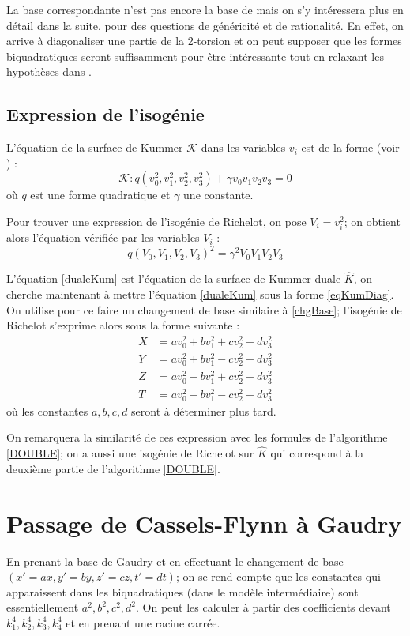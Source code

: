 \documentclass[a4paper]{article}
\theoremstyle{definition}
\theoremstyle{remark}
\numberwithin{equation}{section}
\begin{document}
La base correspondante n'est pas encore la base de \citet{gaudry} mais on s'y intéressera plus en détail dans la suite, pour des questions de généricité et de rationalité. En effet, on arrive à diagonaliser une partie de la 2-torsion et on peut supposer que les formes biquadratiques seront suffisamment pour être intéressante tout en relaxant les hypothèses dans \citep{gaudry}.

\subsection{Expression de l'isogénie}
L'équation de la surface de Kummer $\mathcal{K}$ dans les variables $v_i$ est de la forme (voir \citet{cassels-Flynn}) :
\begin{equation}
\label{eqKumDiag}
\mathcal{K} : q(v_0^2,v_1^2,v_2^2,v_3^2)+\gamma v_0v_1v_2v_3 = 0
\end{equation}
où $q$ est une forme quadratique et $\gamma$ une constante.

Pour trouver une expression de l'isogénie de Richelot, on pose $V_i = v_i^2$; on obtient alors l'équation vérifiée par les variables $V_i$  :
\begin{equation}
\label{dualeKum}
q(V_0,V_1,V_2,V_3)^2 = \gamma^2 V_0V_1V_2V_3
\end{equation}

L'équation \ref{dualeKum} est l'équation de la surface de Kummer duale $\hat{K}$, on cherche maintenant à mettre l'équation \ref{dualeKum} sous la forme \ref{eqKumDiag}. On utilise pour ce faire un changement de base similaire à \ref{chgBase}; l'isogénie de Richelot s'exprime alors sous la forme suivante :
\begin{align*}
X &= av_0^2+bv_1^2+cv_2^2+dv_3^2 \\
Y &= av_0^2+bv_1^2-cv_2^2-dv_3^2 \\
Z &= av_0^2-bv_1^2+cv_2^2-dv_3^2 \\
T &= av_0^2-bv_1^2-cv_2^2+dv_3^2
\end{align*}
où les constantes $a,b,c,d$ seront à déterminer plus tard.

On remarquera la similarité de ces expression avec les formules de l'algorithme \ref{DOUBLE}; on a aussi une isogénie de Richelot sur $\hat{K}$ qui correspond à la deuxième partie de l'algorithme \ref{DOUBLE}.

\section{Passage de Cassels-Flynn à Gaudry}
En prenant la base de Gaudry et en effectuant le changement de base $(x'=ax,y'=by,z'=cz,t'=dt)$; on se rend compte que les constantes qui apparaissent dans les biquadratiques (dans le modèle intermédiaire) sont essentiellement $a^2,b^2,c^2,d^2$. On peut les calculer à partir des coefficients devant $k_1^4,k_2^4,k_3^4,k_4^4$ et en prenant une racine carrée.
\end{document}
